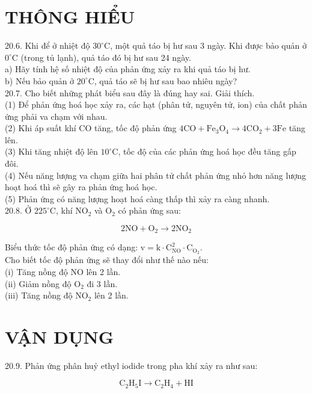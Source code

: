 \documentclass[10pt]{article}
\begin{document}
\section*{THÔNG HIỂU}
20.6. Khi để ở nhiệt độ $30^{\circ} \mathrm{C}$, một quả táo bị hư sau 3 ngày. Khi được bảo quản ở $0^{\circ} \mathrm{C}$ (trong tủ lạnh), quả táo đó bị hư sau 24 ngày.\\
a) Hãy tính hệ số nhiệt độ của phản ứng xảy ra khi quả táo bị hư.\\
b) Nếu bảo quản ở $20^{\circ} \mathrm{C}$, quả táo sẽ bị hư sau bao nhiêu ngày?\\
20.7. Cho biết những phát biểu sau đây là đúng hay sai. Giải thích.\\
(1) Để phản ứng hoá học xảy ra, các hạt (phân tử, nguyên tử, ion) của chất phản ứng phải va chạm với nhau.\\
(2) Khi áp suất khí CO tăng, tốc độ phản ứng $4 \mathrm{CO}+\mathrm{Fe}_{3} \mathrm{O}_{4} \rightarrow 4 \mathrm{CO}_{2}+3 \mathrm{Fe}$ tăng lên.\\
(3) Khi tăng nhiệt độ lên $10^{\circ} \mathrm{C}$, tốc độ của các phản ứng hoá học đều tăng gấp đôi.\\
(4) Nếu năng lượng va chạm giữa hai phân tử chất phản ứng nhỏ hơn năng lượng hoạt hoá thì sẽ gây ra phản ứng hoá học.\\
(5) Phản ứng có năng lượng hoạt hoá càng thấp thì xảy ra càng nhanh.\\
20.8. Ở $225^{\circ} \mathrm{C}$, khí $\mathrm{NO}_{2}$ và $\mathrm{O}_{2}$ có phản ứng sau:

$$
2 \mathrm{NO}+\mathrm{O}_{2} \rightarrow 2 \mathrm{NO}_{2}
$$

Biểu thức tốc độ phản ứng có dạng: $\mathrm{v}=\mathrm{k} \cdot \mathrm{C}_{\mathrm{NO}}^{2} \cdot \mathrm{C}_{\mathrm{O}_{2}}$.\\
Cho biết tốc độ phản ứng sẽ thay đổi như thế nào nếu:\\
(i) Tăng nồng độ NO lên 2 lần.\\
(ii) Giảm nồng độ $\mathrm{O}_{2}$ đi 3 lần.\\
(iii) Tăng nồng độ $\mathrm{NO}_{2}$ lên 2 lần.

\section*{VẬN DỤNG}
20.9. Phản ứng phân huỷ ethyl iodide trong pha khí xảy ra như sau:

$$
\mathrm{C}_{2} \mathrm{H}_{5} \mathrm{I} \rightarrow \mathrm{C}_{2} \mathrm{H}_{4}+\mathrm{HI}
$$
\end{document}
